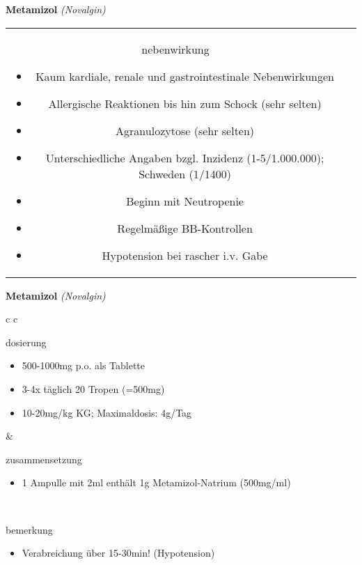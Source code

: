 \begin{frame}{
    \textbf{Metamizol}
    \textit{(Novalgin)}
}
\begin{tabular}{c c}
\begin{beamercolorbox}[wd=\boxwidth\textwidth,ht=\boxheight\textheight,sep=1em]{nebenwirkung}
            \tiny
            \begin{itemize}
                \item Kaum kardiale, renale und gastrointestinale Nebenwirkungen
                \item Allergische Reaktionen bis hin zum Schock (sehr selten)
                \item Agranulozytose (sehr selten)
                \item Unterschiedliche Angaben bzgl. Inzidenz (1-5/1.000.000); Schweden (1/1400)
                \item Beginn mit Neutropenie
                \item Regelmäßige BB-Kontrollen
                \item Hypotension bei rascher i.v. Gabe
            \end{itemize}
        \end{beamercolorbox} \\
    \end{tabular}
\end{frame}

\begin{frame}{
    \textbf{Metamizol}
    \textit{(Novalgin)}
}
    \begin{tabular}{c c}
        \begin{beamercolorbox}[wd=\boxwidth\textwidth,ht=\boxheight\textheight,sep=1em]{dosierung}
            \begin{itemize}
                \item 500-1000mg p.o. als Tablette 
                \item 3-4x täglich 20 Tropen (=500mg)
                \item 10-20mg/kg KG; Maximaldosis: 4g/Tag
            \end{itemize}
        \end{beamercolorbox} & 
        \begin{beamercolorbox}[wd=\boxwidth\textwidth,ht=\boxheight\textheight,sep=1em]{zusammensetzung}
            \begin{itemize}
                \item 1 Ampulle mit 2ml enthält 1g Metamizol-Natrium (500mg/ml)
            \end{itemize}
        \end{beamercolorbox} \\
        \begin{beamercolorbox}[wd=\textwidth,ht=\boxheight\textheight,sep=1em]{bemerkung}
            \begin{itemize}
                \item Verabreichung über 15-30min! (Hypotension)
            \end{itemize}
        \end{beamercolorbox} \\
    \end{tabular}
\end{frame}

